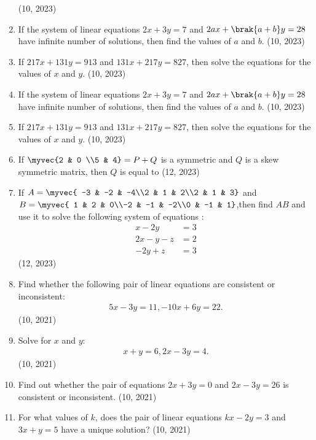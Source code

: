 \begin{enumerate}[label=\thesubsection.\arabic*,ref=\thesubsection.\theenumi]
\hfill (10, 2023)
\item If the system of linear equations 
$2x + 3y = 7$  and   $2ax +\brak{a + b}y =28$ 
have infinite number of solutions, then find the values of $a$ and $b$.
\hfill (10, 2023)
\item  If $217x + 131y = 913$ and  
$131x + 217y = 827$,  then solve the equations for the values of $x$ and $y$.
\hfill (10, 2023)
\item If the system of linear equations 
$2x + 3y = 7$  and   $2ax +\brak{a + b}y =28$ 
have infinite number of solutions, then find the values of $a$ and $b$.
\hfill (10, 2023)
\item  If $217x + 131y = 913$ and  
$131x + 217y = 827$,  then solve the equations for the values of $x$ and $y$.
\hfill (10, 2023)
    \item If $\myvec{2 & 0 \\5 & 4} = P + Q$ 
is a symmetric and $Q$ is a skew symmetric matrix, then $Q$ is equal to
\hfill (12, 2023)
    \item If $A=\myvec{ -3 & -2 & -4\\2 & 1 & 2\\2 & 1 & 3}$
and $B =\myvec{  1 & 2 & 0\\-2 & -1 & -2\\0 & -1 & 1}$,then find $AB$ and use it to solve the following system of equations :
\begin{align} x - 2y &= 3\\2x - y - z &= 2\\-2y + z &= 3\end{align}
\hfill (12, 2023)
    \item Find whether the following pair of linear equations are consistent or inconsistent:
    \begin{align*}
     5x - 3y = 11, -10x + 6y = 22.
    \end{align*}
\hfill (10, 2021)
    \item Solve for $x$ and $y$:
    \begin{align*}
    x + y = 6, 2x - 3y = 4.
    \end{align*}
\hfill (10, 2021)
    \item Find out whether the pair of equations $2x + 3y = 0$ and $2x - 3y = 26$ is consistent or inconsistent.
\hfill (10, 2021)
    
    \item For what values of $k$, does the pair of linear equations $kx - 2y = 3$ and $3x + y = 5$ have a unique solution?
\hfill (10, 2021)
    

\end{enumerate}
